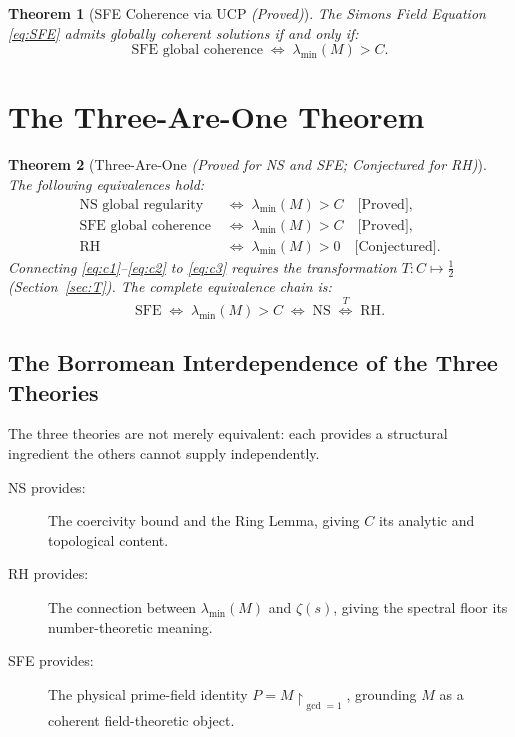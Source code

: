 \documentclass[12pt]{article}
\newtheorem{theorem}{Theorem}[section]
\begin{document}
\begin{theorem}[SFE Coherence via UCP \emph{(Proved)}]
\label{thm:SFE}
The Simons Field Equation \eqref{eq:SFE} admits globally
coherent solutions if and only if:
\begin{equation}
\boxed{
\text{SFE global coherence}
\;\Longleftrightarrow\;
\lambda_{\min}(M) > C.
}
\label{eq:SFEreduction}
\end{equation}
\end{theorem}

\section{The Three-Are-One Theorem}

\begin{theorem}[Three-Are-One \emph{(Proved for NS and SFE;
Conjectured for RH)}]
\label{thm:TAO}
The following equivalences hold:
\begin{align}
\text{NS global regularity}
&\;\Longleftrightarrow\; \lambda_{\min}(M) > C
\quad \text{[Proved]},
\label{eq:c1}\\[4pt]
\text{SFE global coherence}
&\;\Longleftrightarrow\; \lambda_{\min}(M) > C
\quad \text{[Proved]},
\label{eq:c2}\\[4pt]
\text{RH}
&\;\Longleftrightarrow\; \lambda_{\min}(M) > 0
\quad \text{[Conjectured]}.
\label{eq:c3}
\end{align}
Connecting \eqref{eq:c1}--\eqref{eq:c2} to \eqref{eq:c3}
requires the transformation $T: C \mapsto \tfrac{1}{2}$
(Section~\ref{sec:T}). The complete equivalence chain is:
\begin{equation}
\text{SFE}
\;\Longleftrightarrow\;
\lambda_{\min}(M) > C
\;\Longleftrightarrow\;
\text{NS}
\;\overset{T}{\Longleftrightarrow}\;
\text{RH}.
\label{eq:chain}
\end{equation}
\end{theorem}

\subsection{The Borromean Interdependence of the Three Theories}

The three theories are not merely equivalent: each provides
a structural ingredient the others cannot supply independently.

\begin{description}
\item[NS provides:] The coercivity bound and the Ring Lemma,
  giving $C$ its analytic and topological content.
\item[RH provides:] The connection between $\lambda_{\min}(M)$
  and $\zeta(s)$, giving the spectral floor its
  number-theoretic meaning.
\item[SFE provides:] The physical prime-field identity
  $P = M\upharpoonright_{\gcd=1}$,
  grounding $M$ as a coherent field-theoretic object.
\end{description}
\end{document}
